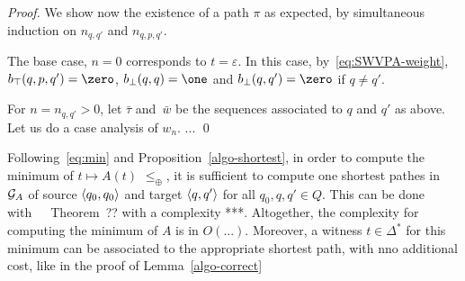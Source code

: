 \begin{proof}
\noindent
We show now the existence of a path $\pi$ as expected, %
by simultaneous induction on $n_{q, q'}$ and $n_{q, p, q'}$.

\noindent
The base case, $n = 0$ corresponds to $t = \varepsilon$. 
In this case, by~\eqref{eq:SWVPA-weight}, $b_\top(q, p, q') = \zero$,
$b_\bot(q, q) = \one$ and $b_\bot(q, q') = \zero$ if $q \neq q'$.

\noindent
For $n = n_{q, q'} > 0$, let $\bar\tau$ and~$\bar{w}$
be the sequences associated to $q$ and $q'$ as above.
Let us do a case analysis of $w_n$.
... \qed
\end{proof}

\medskip\noindent
Following~\eqref{eq:min} and Proposition~\ref{algo-shortest}, 
in order to compute the minimum of $t \mapsto A(t)$ \wrt $\leq_\oplus$, 
it is sufficient to compute one shortest pathes in $\mathcal{G}_{A}$ of source
$\<q_0, q_0>$ and target $\<q, q'>$ for all $q_0, q, q' \in Q$.
This can be done with~~\cite{Mohri02semiring}~Theorem~?? 
with a complexity ***. Altogether, the complexity for computing the minimum of $A$
is in $O(...)$.
Moreover, a witness $t \in \Delta^*$ for this minimum can be associated to the appropriate
shortest path, with nno additional cost, like in the proof of Lemma~\ref{algo-correct}





